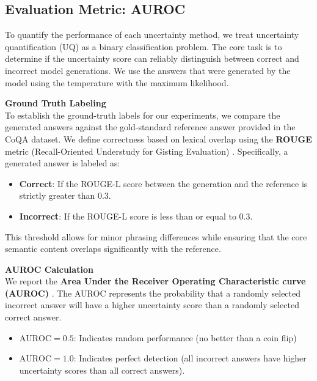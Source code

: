 \subsection{Evaluation Metric: AUROC}
\label{sec:experiments:setup:evaluation}
To quantify the performance of each uncertainty method, we treat
uncertainty quantification (UQ) as a binary classification problem. The core
task is to determine if the uncertainty score can reliably distinguish
between correct and incorrect model generations. We use the answers
that were generated by the model using the temperature with the 
maximum likelihood.

\textbf{Ground Truth Labeling} \\
To establish the ground-truth labels for our experiments, we compare 
the generated answers against the gold-standard reference answer 
provided in the CoQA dataset. We define correctness based on lexical 
overlap using the \textbf{ROUGE} metric (Recall-Oriented Understudy 
for Gisting Evaluation) 
\parencite{lin-2004-rouge}. Specifically, a generated answer is 
labeled as:

\begin{itemize}
	\item \textbf{Correct}: If the ROUGE-L score between the 
	    generation and the reference is strictly greater than $0.3$.

	\item \textbf{Incorrect}: If the ROUGE-L score is less than or 
	    equal to $0.3$.
\end{itemize}

This threshold allows for minor phrasing differences while ensuring
that the core semantic content overlaps significantly with the reference.

\textbf{AUROC Calculation} \\
We report the 
\textbf{Area Under the Receiver Operating Characteristic curve (AUROC)}
\parencite{BRADLEY19971145}.
The AUROC represents the probability that a randomly selected incorrect 
answer will have a higher uncertainty score than a randomly 
selected correct answer.

\begin{itemize}
    \item $\text{AUROC} = 0.5$: Indicates random performance 
	(no better than a coin flip)

    \item $\text{AUROC} = 1.0$: Indicates perfect detection 
	(all incorrect answers have higher uncertainty scores than all 
	correct answers).
\end{itemize}

